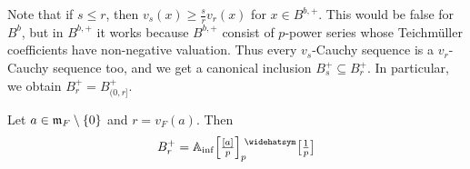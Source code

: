 \begin{rem}\label{rem:Bs+}
	Note that if $s\leq r$, then $v_s(x)\geq \frac{s}{r}v_r(x)$ for $x\in B^{b,+}$. This would be false for $B^b$, but in $B^{b,+}$ it works because $B^{b,+}$ consist of $p$-power series whose Teichmüller coefficients have non-negative valuation. Thus every $v_s$-Cauchy sequence is a $v_r$-Cauchy sequence too, and we get a canonical inclusion $B_s^+\subseteq B_r^+$. In particular, we obtain $B_r^+=B_{(0,r]}^+$.
\end{rem}
\begin{lem}\label{lem:Br+Ainfap}
	Let $a\in\mathfrak{m}_F\setminus\{0\}$ and $r=v_F(a)$. Then
	\begin{equation*}
		B_r^+=\IA_\inf\Big[\textstyle\frac{[a]}p\Big]_p^\complete\localize{p}
	\end{equation*}
\end{lem}
